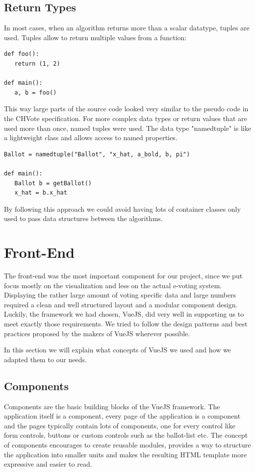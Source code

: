 \subsection{Return Types}
In most cases, when an algorithm returns more than a scalar datatype, tuples are used. Tuples allow to return multiple values from a function:

\begin{verbatim}
def foo():
   return (1, 2)

def main():
   a, b = foo()
\end{verbatim}

This way large parts of the source code looked very similar to the pseudo code in the CHVote specification. For more complex data types or return values that are used more than once, named tuples were used. The data type "namedtuple" is like a lightweight class and allows access to named properties.

\begin{verbatim}
Ballot = namedtuple("Ballot", "x_hat, a_bold, b, pi")

def main():
   Ballot b = getBallot()
   x_hat = b.x_hat
\end{verbatim}

By following this approach we could avoid having lots of container classes only used to pass data structures between the algorithms.

\section{Front-End}
The front-end was the most important component for our project, since we put focus mostly on the visualization and less on the actual e-voting system. Displaying the rather large amount of voting specific data and large numbers required a clean and well structured layout and a modular component design. Luckily, the framework we had chosen, VueJS, did very well in supporting us to meet exactly those requirements. We tried to follow the design patterns and best practices proposed by the makers of VueJS wherever possible.

In this section we will explain what concepts of VueJS we used and how we adapted them to our needs.

\subsection{Components}
Components are the basic building blocks of the VueJS framework. The application itself is a component, every page of the application is a component and the pages typically contain lots of components, one for every control like form controls, buttons or custom controls such as the ballot-list etc. The concept of components encourages to create reusable modules, provides a way to structure the application into smaller units and makes the resulting HTML template more expressive and easier to read.

